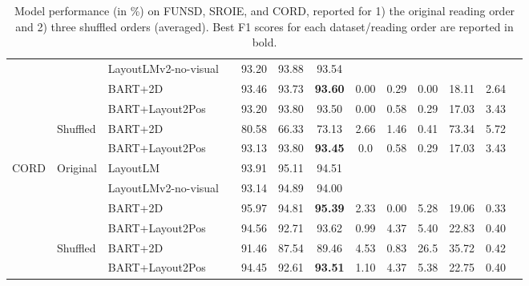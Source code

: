 \begin{table}[h]
\begin{adjustbox}{max width=\textwidth}
\begin{threeparttable}
\begin{tabular}{lllcccccccccc}
      & & LayoutLMv2-no-visual             &  & 93.20 &	93.88 &	93.54 & \cellcolor[gray]{0.9} & \cellcolor[gray]{0.9} & \cellcolor[gray]{0.9} & \cellcolor[gray]{0.9} &  \cellcolor[gray]{0.9} \\
      & & BART+2D & & 93.46 &	93.73 &	\textbf{93.60} & 0.00 &	0.29 &	0.00 &	18.11 &	2.64  \\
      & & BART+Layout2Pos & & 93.20 &	93.80 &	93.50 & 0.00 &	0.58 &	0.29 &	17.03 &	3.43 \\
      \cline{2-12}
      & \multirow{2}{*}{Shuffled} & BART+2D & & 80.58 & 66.33 & 73.13	 &  2.66 & 1.46 & 0.41 & 73.34 & 5.72 \\ 
      & & BART+Layout2Pos & & 93.13 &	93.80 &	\textbf{93.45} & 0.0 & 0.58 & 0.29 & 17.03 & 3.43 \\ 
      \midrule
      \multirow{6}{*}{CORD} & \multirow{4}{*}{Original} & LayoutLM  \citep{xu2020layoutlm} & & 93.91 & 95.11 & 94.51 & \cellcolor[gray]{0.9} & \cellcolor[gray]{0.9} & \cellcolor[gray]{0.9} & \cellcolor[gray]{0.9} & \cellcolor[gray]{0.9}  \\ 
      & & LayoutLMv2-no-visual             & & 93.14 &	94.89 &	94.00 & \cellcolor[gray]{0.9} & \cellcolor[gray]{0.9} & \cellcolor[gray]{0.9} & \cellcolor[gray]{0.9} &  \cellcolor[gray]{0.9} \\  
      & & BART+2D & & 95.97 &	94.81 &	\textbf{95.39} & 2.33 & 0.00 & 5.28 & 19.06 &	0.33 \\
      & & BART+Layout2Pos & & 94.56 &	92.71 &	93.62 & 0.99 & 4.37 & 5.40 & 22.83 & 0.40 \\
      \cline{2-12}
      & \multirow{2}{*}{Shuffled} & BART+2D & & 91.46 & 87.54 & 89.46	 & 4.53 & 0.83 & 26.5 & 35.72 & 0.42	 \\ 
      & & BART+Layout2Pos & & 94.45 & 92.61 &	\textbf{93.51} &  1.10 & 4.37 & 5.38 & 22.75 & 0.40  \\ 
      \bottomrule
  \end{tabular}
  \end{threeparttable}
  \end{adjustbox}
  \caption{Model performance (in \%) on FUNSD, SROIE, and CORD, reported for 1) the original reading order and 2) three shuffled orders (averaged). Best F1 scores for each dataset/reading order are reported in bold.}
  \label{table:visual-information-extraction-results}
\end{table}

